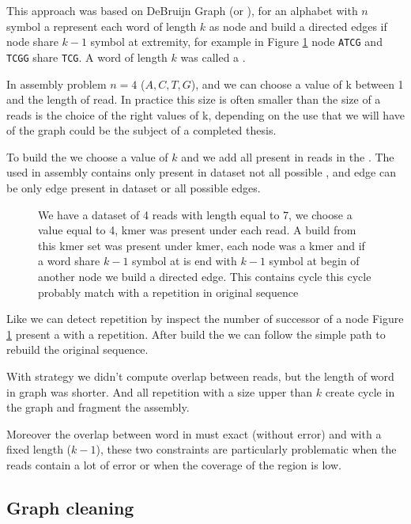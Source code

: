 \documentclass[./main.tex]{subfiles}
\begin{document}
This approach was based on DeBruijn Graph (or \DBG), for an alphabet with $n$ symbol a \DBG represent each word of length $k$ as node and build a directed edges if node share $k - 1$ symbol at extremity, for example in Figure \ref{intro:fig:dbg:graph} node \texttt{ATCG} and \texttt{TCGG} share \texttt{TCG}. A word of length $k$ was called a \kmer.

In assembly problem $n = 4$ (${A, C, T, G}$), and we can choose a value of k between 1 and the length of read. In practice this size is often smaller than the size of a reads is the choice of the right values of k, depending on the use that we will have of the \DBG graph could be the subject of a completed thesis.

To build the \DBG we choose a value of $k$ and we add all \kmer present in reads in the \DBG. The \DBG used in assembly contains only \kmer present in dataset not all possible \kmer, and edge can be only edge present in dataset or all possible edges.

\begin{figure}[ht]
    \center
    
    \caption{We have a dataset of 4 reads with length equal to 7, we choose a value equal to 4, kmer was present under each read. A \DBG build from this kmer set was present under kmer, each node was a kmer and if a word share $k - 1$ symbol at is end with $k - 1$ symbol at begin of another node we build a directed edge. This \DBG contains cycle this cycle probably match with a repetition in original sequence}
    \label{intro:fig:dbg:graph}
\end{figure}

Like \OLC we can detect repetition by inspect the number of successor of a node Figure \ref{intro:fig:dbg:graph} present a \DBG with a repetition. After build the \DBG we can follow the simple path to rebuild the original sequence.

With \DBG strategy we didn't compute overlap between reads, but the length of word in graph was shorter. And all repetition with a size upper than $k$ create cycle in the graph and fragment the assembly.

Moreover the overlap between word in \DBG must exact (without error) and with a fixed length ($k - 1$), these two constraints are particularly problematic when the reads contain a lot of error or when the coverage of the region is low.

\subsection{Graph cleaning}
\end{document}

